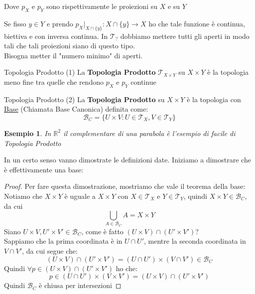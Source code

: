 \documentclass[11pt,a4paper,twoside]{article}
\newtheorem{es}{Esempio}
\theoremstyle{definition}
\begin{document}
\begin{center}
\end{center}
Dove $p_X$ e $p_Y$ sono rispettivamente le proiezioni su $X$ e su $Y$

Se fisso $y \in Y$ e prendo $p_X{\big|}_{X \cap \{y\}} \colon X \cap \{y\} \to X$ ho che tale funzione è continua, biettiva e con inversa continua. In $\mathcal T_?$ dobbiamo mettere tutti gli aperti in modo tali che tali proiezioni siano di questo tipo.\\
Bisogna metter il "numero minimo" di aperti.

\begin{defn}{Topologia Prodotto (1)}{}
	La \textbf{Topologia Prodotto} $\mathcal T_{X \times Y}$ su $X \times Y$ è la topologia meno fine tra quelle che rendono $p_X$ e $p_Y$ continue
\end{defn}

\begin{defn}{Topologia Prodotto (2)}{}
	La \textbf{Topologia Prodotto} su $X \times Y$ è la topologia con \underline{Base} (Chiamata Base Canonica) definita come:
	\[\mathcal B_C = \{U \times V: U \in \mathcal T_X,V \in \mathcal T_Y \}\]
\end{defn}

\begin{es}
	In $\mathbb R^2$ il complementare di una parabola è l'esempio di facile di Topologia Prodotto
\end{es}

In un certo senso vanno dimostrate le definizioni date. Iniziamo a dimostrare che è effettivamente una base:

\begin{proof}
	Per fare questa dimostrazione, mostriamo che vale il teorema della base:\\
	 Notiamo che $X \times Y$ è uguale a $X \times Y$ con $X \in \mathcal T_X$ e $Y \in \mathcal T_Y$, quindi $X \times Y \in \mathcal B_C$, da cui \[\bigcup_{A \in \mathcal B_C}A = X \times Y\]
	 Siano $U \times V, U' \times V' \in \mathcal B_C$, come è fatto $(U\times V) \cap (U' \times V')$?\\
	Sappiamo che la prima coordinata è in $U \cap U'$, mentre la seconda coordinata in $V \cap V'$, da cui segue che:
	\[ (U \times V) \cap (U' \times V') = (U \cap U') \times (V \cap V') \in \mathcal B_C \]
	Quindi $\forall p \in (U \times V)\cap (U' \times V')$ ho che:
	\[p \in (U \cap U') \times (V \times V') = (U \times V) \cap (U' \times V')\]
	Quindi $\mathcal B_C$ è chiusa per intersezioni
\end{proof}
\end{document}
